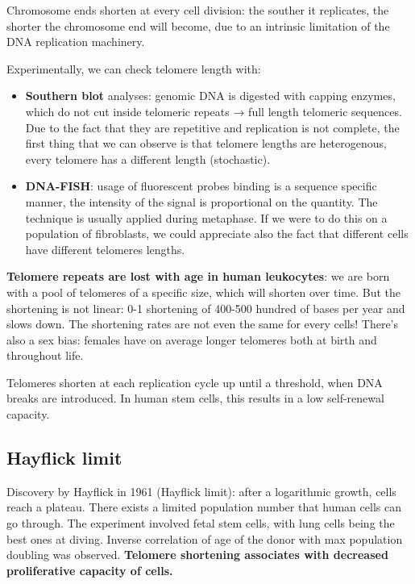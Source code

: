 Chromosome ends shorten at every cell division: the souther it
replicates, the shorter the chromosome end will become, due to an
intrinsic limitation of the DNA replication machinery.

Experimentally, we can check telomere length with:

\begin{itemize}
\tightlist
\item
  \textbf{Southern blot} analyses: genomic DNA is digested with capping
  enzymes, which do not cut inside telomeric repeats → full length
  telomeric sequences. Due to the fact that they are repetitive and
  replication is not complete, the first thing that we can observe is
  that telomere lengths are heterogenous, every telomere has a different
  length (stochastic).
\item
  \textbf{DNA-FISH}: usage of fluorescent probes binding is a sequence
  specific manner, the intensity of the signal is proportional on the
  quantity. The technique is usually applied during metaphase. If we
  were to do this on a population of fibroblasts, we could appreciate
  also the fact that different cells have different telomeres lengths.
\end{itemize}

\textbf{Telomere repeats are lost with age in human leukocytes}: we are
born with a pool of telomeres of a specific size, which will shorten
over time. But the shortening is not linear: 0-1 shortening of 400-500
hundred of bases per year and slows down. The shortening rates are not
even the same for every cells! There's also a sex bias: females have on
average longer telomeres both at birth and throughout life.

Telomeres shorten at each replication cycle up until a threshold, when
DNA breaks are introduced. In human stem cells, this results in a low
self-renewal capacity.

\hypertarget{hayflick-limit}{%
\subsection{Hayflick limit}\label{hayflick-limit}}

Discovery by Hayflick in 1961 (Hayflick limit): after a logarithmic
growth, cells reach a plateau. There exists a limited population number
that human cells can go through. The experiment involved fetal stem
cells, with lung cells being the best ones at diving. Inverse
correlation of age of the donor with max population doubling was
observed. \textbf{Telomere shortening associates with decreased
proliferative capacity of cells.}


